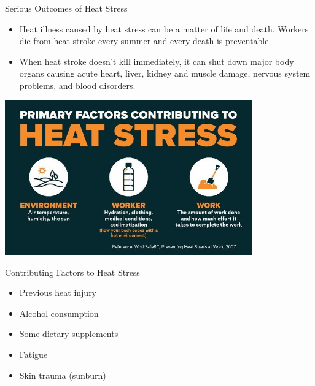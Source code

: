\documentclass[aspectratio=169,notes]{beamer}
\begin{document}
\begin{frame}{Serious Outcomes of Heat Stress}
    \begin{itemize}
        \item Heat illness caused by heat stress can be a matter of life and death. Workers die from heat stroke every summer and every death is preventable.
        \item When heat stroke doesn't kill immediately, it can shut down major body organs causing acute heart, liver, kidney and muscle damage, nervous system problems, and blood disorders.
    \end{itemize}
\end{frame}
\begin{frame}
    \centering
    \includegraphics[width=0.8\textwidth, height=0.8\textheight, keepaspectratio]{primary_factors.jpg}
\end{frame}
\begin{frame}{Contributing Factors to Heat Stress}
    \begin{itemize}
        \item Previous heat injury
        \item Alcohol consumption
        \item Some dietary supplements
        \item Fatigue
        \item Skin trauma (sunburn)
    \end{itemize}
\end{frame}
\end{document}
